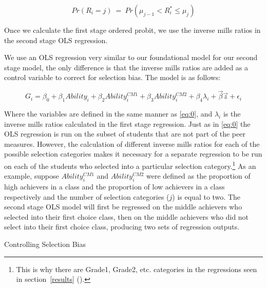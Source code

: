 \documentclass[12pt,a4paper,english,fleqn]{article}
\makeatletter
\newcommand{\sectlabel}[1]{section~\ref{#1} (\nameref{#1})}
\renewcommand\subsection{\@startsection{subsection}{2}
{\z@}{-3.25ex\@plus -1ex \@minus -.2ex}{1.5ex \@plus .2ex}{\normalfont\bf}}
\makeatother
\begin{document}
\setlength{\belowdisplayskip}{5pt} \setlength{\belowdisplayshortskip}{1pt}
\setlength{\abovedisplayskip}{-4pt} \setlength{\abovedisplayshortskip}{1pt}

\begin{equation}\label{eq:3}
Pr(R_{i} = j) \ = \ Pr(\mu_{j-1} < R_{i}^{*} \leq \mu_{j})
\end{equation}

\noindent Once we calculate the first stage ordered probit, we use the inverse mills ratios in the second stage OLS regression.

We use an OLS regression very similar to our foundational model for our second stage model, the only difference is that the inverse mills ratios are added as a control variable to correct for selection bias. The model is as follows:

\begin{equation}\label{eq:4}
G_{i} = \beta_{0} + \beta_{1} Ability_{i} + \beta_{2} Ability_{i}^{CM1} + \beta_{3} Ability_{i}^{CM2} + \beta_{4} \lambda_{i} + \overrightarrow{\beta} \overrightarrow{z} + \epsilon_{i}
\end{equation}

Where the variables are defined in the same manner as \eqref{eq:0}, and $\lambda_{i}$ is the inverse mills ratios calculated in the first stage regression.
Just as in \eqref{eq:0} the OLS regression is run on the subset of students that are not part of the peer measures. 
However, the calculation of different inverse mills ratios for each of the possible selection categories makes it necessary for a separate regression to be run on each of the students who selected into a particular selection category.\footnote{This is why there are Grade1, Grade2, etc. categories in the regressions seen in \sectlabel{results}.}
As an example, suppose $Ability_{i}^{CM1}$ and $Ability_{i}^{CM2}$ were defined as the proportion of high achievers in a class and the proportion of low achievers in a class respectively and the number of selection categories ($j$) is equal to two. 
The second stage OLS model will first be regressed on the middle achievers who selected into their first choice class, then on the middle achievers who did not select into their first choice class, producing two sets of regression outputs. 

\subsection{Controlling Selection Bias}
\end{document}
